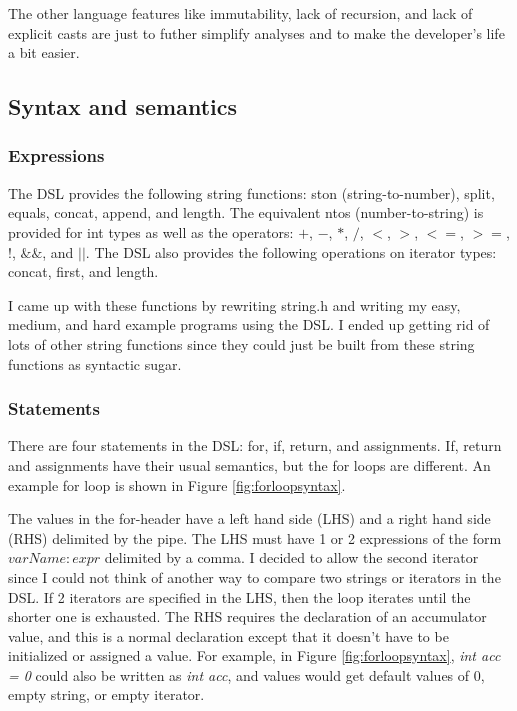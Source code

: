 \documentclass[letterpaper]{article}
\begin{document}
The other language features like immutability, lack of recursion, and lack of
explicit casts are just to futher simplify analyses and to make the developer's
life a bit easier.

\subsection{Syntax and semantics}

\subsubsection{Expressions}

The DSL provides the following string functions: ston (string-to-number), split,
equals, concat, append, and length. The equivalent ntos (number-to-string) is
provided for int types as well as the operators: $+$, $-$, $*$, $/$, $<$, $>$, $<=$,
$>=$, $!$, $\&\&$, and $||$. The DSL also provides the following operations on
iterator types: concat, first, and length.

I came up with these functions by rewriting string.h and writing my easy, medium,
and hard example programs using the DSL. I ended up getting rid of lots of other
string functions since they could just be built from these string functions as
syntactic sugar.

\subsubsection{Statements}

There are four statements in the DSL: for, if, return, and assignments. If, return
and assignments have their usual semantics, but the for loops are different. An example
for loop is shown in Figure \ref{fig:forloopsyntax}.

The values in the for-header
have a left hand side (LHS) and a right hand side (RHS) delimited by the pipe. The LHS
must have 1 or 2 expressions of the form $varName : expr$ delimited by a comma. I
decided to allow the second iterator since I could not think of another way to compare
two strings or iterators in the DSL. If 2 iterators are specified in the LHS, then the
loop iterates until the shorter one is exhausted. The RHS requires the declaration of an
accumulator value, and this is a normal declaration except that it doesn't have to be
initialized or assigned a value. For example, in Figure \ref{fig:forloopsyntax},
\textit{int acc = 0} could also be written as \textit{int acc}, and values would get default values
of 0, empty string, or empty iterator.
\end{document}
